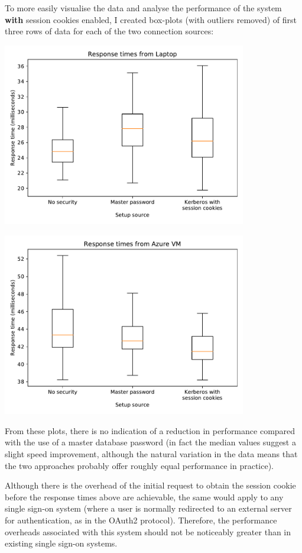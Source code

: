 \documentclass[12pt]{report}
\begin{document}
To more easily visualise the data and analyse the performance of the system \textbf{with} session cookies enabled, I created box-plots (with outliers removed) of first three rows of data for each of the two connection sources:

\begin{center}
  \includegraphics[width=0.8\textwidth]{11-response-times-laptop.pdf}
\end{center}

\begin{center}
  \includegraphics[width=0.8\textwidth]{12-response-times-azure.pdf}
\end{center}

From these plots, there is no indication of a reduction in performance compared with the use of a master database password (in fact the median values suggest a slight speed improvement, although the natural variation in the data means that the two approaches probably offer roughly equal performance in practice).

Although there is the overhead of the initial request to obtain the session cookie before the response times above are achievable, the same would apply to any single sign-on system (where a user is normally redirected to an external server for authentication, as in the OAuth2 protocol). Therefore, the performance overheads associated with this system should not be noticeably greater than in existing single sign-on systems.
\end{document}
